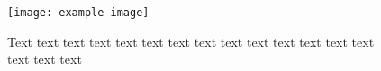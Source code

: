 \documentclass{beamer}
\begin{document}
\begin{frame}
\begin{figure}
\begin{minipage}{.4\textwidth}
\texttt{[image: example-image]}
\caption{Text text text text text text text text text text text text text text text text text}
\end{minipage}
\end{figure}
\end{frame}
\end{document}
